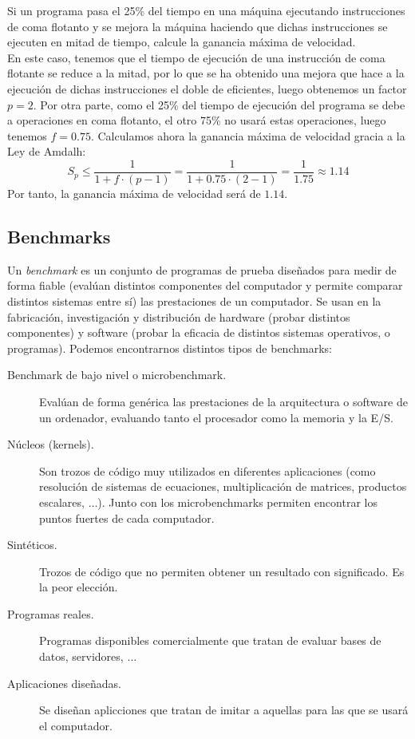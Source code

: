 \begin{ejemplo}
    Si un programa pasa el 25\% del tiempo en una máquina ejecutando instrucciones de coma flotanto y se mejora la máquina haciendo que dichas instrucciones se ejecuten en mitad de tiempo, calcule la ganancia máxima de velocidad.\\

    En este caso, tenemos que el tiempo de ejecución de una instrucción de coma flotante se reduce a la mitad, por lo que se ha obtenido una mejora que hace a la ejecución de dichas instrucciones el doble de eficientes, luego obtenemos un factor $p = 2$. Por otra parte, como el 25\% del tiempo de ejecución del programa se debe a operaciones en coma flotanto, el otro 75\% no usará estas operaciones, luego tenemos $f = 0.75$. Calculamos ahora la ganancia máxima de velocidad gracia a la Ley de Amdalh:
    \begin{equation*}
        S_p \leq \dfrac{1}{1+f\cdot(p-1)} = \dfrac{1}{1+0.75\cdot(2-1)}= \dfrac{1}{1.75} \approx 1.14
    \end{equation*}
    Por tanto, la ganancia máxima de velocidad será de $1.14$.
\end{ejemplo}

\subsection{Benchmarks}
Un \emph{benchmark} es un conjunto de programas de prueba diseñados para medir de forma fiable (evalúan distintos componentes del computador y permite comparar distintos sistemas entre sí) las prestaciones de un computador. Se usan en la fabricación, investigación y distribución de hardware (probar distintos componentes) y software (probar la eficacia de distintos sistemas operativos, o programas). Podemos encontrarnos distintos tipos de benchmarks:

\begin{description}
    \item [Benchmark de bajo nivel o microbenchmark.]
        Evalúan de forma genérica las prestaciones de la arquitectura o software de un ordenador, evaluando tanto el procesador como la memoria y la E/S.
    \item [Núcleos (kernels).]
        Son trozos de código muy utilizados en diferentes aplicaciones (como resolución de sistemas de ecuaciones, multiplicación de matrices, productos escalares, $\ldots$). Junto con los microbenchmarks permiten encontrar los puntos fuertes de cada computador.
    \item [Sintéticos.]
        Trozos de código que no permiten obtener un resultado con significado. Es la peor elección.
    \item [Programas reales.]
        Programas disponibles comercialmente que tratan de evaluar bases de datos, servidores, $\ldots$
    \item [Aplicaciones diseñadas.]
        Se diseñan aplicciones que tratan de imitar a aquellas para las que se usará el computador. 
\end{description}

